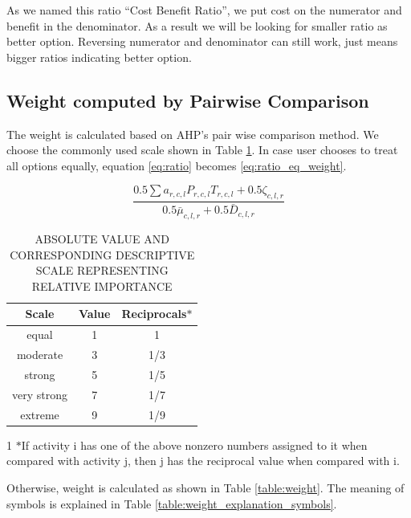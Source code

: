 As we named this ratio ``Cost Benefit Ratio'', we put cost on the numerator and benefit in the denominator. As a result we will be looking for smaller ratio as better option. Reversing numerator and denominator can still work, just means bigger ratios indicating better option.

\subsection{Weight computed by Pairwise Comparison}
\label{sec:weight&pairwise_comparison}
The weight is calculated based on AHP's pair wise comparison method. We choose the commonly used scale    \cite{ghodsypour1998decision}   \cite{haas2005illustrated} shown in Table \ref{table:scale}. In case user chooses to treat all options equally, equation \eqref{eq:ratio} becomes \eqref{eq:ratio_eq_weight}.

\begin{equation}\label{eq:ratio_eq_weight}
\frac{ 0.5\sum {{a_{r,c,l}}{P_{r,c,l}}{T_{r,c,l}}} + 0.5{\zeta_{c,l,r} }}{{ 0.5{{\bar \mu }_{c,l,r}} + 0.5{{\bar D}_{c,l,r}}}}
\end{equation}

\begin{table}[!ht]
\begin{center}\caption{ABSOLUTE VALUE AND CORRESPONDING DESCRIPTIVE SCALE REPRESENTING RELATIVE IMPORTANCE} \label{table:scale}
\begin{tabular}{|c|c|c|}
\hline
\textbf{Scale }&  \textbf{Value } & Reciprocals\tnote{1}$*$ \\
\hline equal & 1 & 1\\
\hline moderate & 3 & 1/3 \\
\hline strong & 5 & 1/5 \\
\hline very strong & 7 & 1/7 \\
\hline extreme & 9 & 1/9\\
\hline
\end{tabular}
\begin{tablenotes}
  \item[1] $*$If activity i has one of the above nonzero numbers assigned to it when compared with activity j, then j has the reciprocal value when compared with i.
\end{tablenotes}
\end{center}
\end{table}

Otherwise, weight is calculated as shown in Table \ref{table:weight}. 
The meaning of symbols is explained in Table \ref{table:weight_explanation_symbols}.

